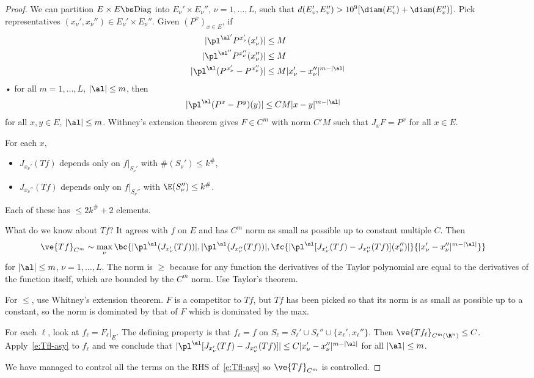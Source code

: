 \begin{proof} 
We can partition $E\times E\bs\text{Diag}$ into $E_\nu'\times E_\nu''$, $\nu=1,\ldots, L$, such that 
$d(E_v',E_v'') >10^9 [\diam(E_v') + \diam(E_v'')]$. 
Pick representatives $(x_\nu',x_\nu'')\in E_\nu'\times E_\nu''$. Given $(P^x)_{x\in E}$, if 
\begin{align}
|\pl^{\al'} P^{x_\nu'}(x_\nu')|&\le M\\
|\pl^{\al''} P^{x_\nu''}(x_\nu'')|&\le M\\
|\pl^\al (P^{x_\nu'} - P^{x_\nu''})|&\le M|x_\nu'-x_\nu''|^{m-|\al|}
\end{align}•
for all $m=1,\ldots, L$, $|\al|\le m$, then 
\begin{align}
|\pl^\al (P^x-P^y) (y)|&\le CM|x-y|^{m-|\al|}
\end{align}
for all $x,y\in E$, $|\al|\le m$. Withney's extension theorem gives $F\in C^m$ with norm $C'M$ such that $J_xF=P^x$ for all $x\in E$.

For each $x$, 
\begin{itemize}
\item
$J_{x_\nu'}(Tf)$ depends only on $f|_{S_\nu'}$ with $\#(S_\nu')\le k^\#$, 
\item
$J_{x_\nu''}(Tf)$ depends only on $f|_{S_\nu''}$ with $\E(S_\nu'')\le k^\#$.
\end{itemize}
Each of these has $\le 2k^\#+2$ elements.

What do we know about $Tf$? It agrees with $f$ on $E$ and has $C^m$ norm as small as possible up to constant multiple $C$. Then
\begin{align}
\ve{Tf}_{C^m} &\sim
\max_\nu
\bc{
|\pl^\al(J_{x_\nu'}(Tf))|, 
|\pl^\al(J_{x_\nu''}(Tf))|,
\fc{|\pl^\al[J_{x_\nu'}(Tf)-J_{x_\nu''}(Tf)](x_\nu'')|}{|x_\nu'-x_\nu''|^{m-|\al|}
}}
\label{e:Tfl-asy}
\end{align}
for $|\al|\le m$, $\nu=1,\ldots, L$.
The norm is $\ge$ because for any function the derivatives of the Taylor polynomial are equal to the derivatives of the function itself, which are bounded by the $C^m$ norm. Use Taylor's theorem.

For $\le$, use Whitney's extension theorem. $F$ is a competitor to $Tf$, but $Tf$ has been picked so that its norm is as small as possible up to a constant, so the norm is dominated by that of $F$ which is dominated by the max.

For each $\ell$, look at $f_\ell = F_\ell |_E$. The defining property is that $f_\ell=f$ on $S_\ell=S_{\ell}'\cup S_\ell''\cup \{x_\ell',x_\ell''\}$.
Then $\ve{Tf_\ell}_{C^m(\R^n)}\le C$. 
Apply~\eqref{e:Tfl-asy} to $f_\ell$ and we conclude that $|\pl^\al[J_{x_\nu'}(Tf)-J_{x_\nu''}(Tf)]|\le C|x_\nu'-x_\nu''|^{m-|\al|}$ for all $|\al|\le m$.

We have managed to control all the terms on the RHS of~\eqref{e:Tfl-asy} so $\ve{Tf}_{C^m}$ is controlled. 
\end{proof}

